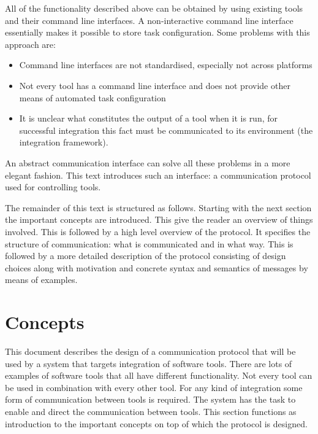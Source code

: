 \documentclass{article}
\begin{document}
  All of the functionality described above can be obtained by using existing
  tools and their command line interfaces. A non-interactive command line
  interface essentially makes it possible to store task configuration. Some
  problems with this approach are:
  \begin{itemize}
   \item Command line interfaces are not standardised, especially not across
         platforms
   \item Not every tool has a command line interface and does not provide other
         means of automated task configuration
   \item It is unclear what constitutes the output of a tool when it is run,
         for successful integration this fact must be communicated to its
         environment (the integration framework).
  \end{itemize}
  An abstract communication interface can solve all these problems in a more
  elegant fashion. This text introduces such an interface: a communication
  protocol used for controlling tools.


  The remainder of this text is structured as follows. Starting with the next
  section the important concepts are introduced. This give the reader an
  overview of things involved.  This is followed by a high level overview of
  the protocol. It specifies the structure of communication: what is
  communicated and in what way. This is followed by a more detailed description
  of the protocol consisting of design choices along with motivation and
  concrete syntax and semantics of messages by means of examples.


 \section{Concepts}

   This document describes the design of a communication protocol that will be
   used by a system that targets integration of software tools. There are lots
   of examples of software tools that all have different functionality. Not
   every tool can be used in combination with every other tool. For any kind of
   integration some form of communication between tools is required. The system
   has the task to enable and direct the communication between tools.  This
   section functions as introduction to the important concepts on top of which
   the protocol is designed.
\end{document}
